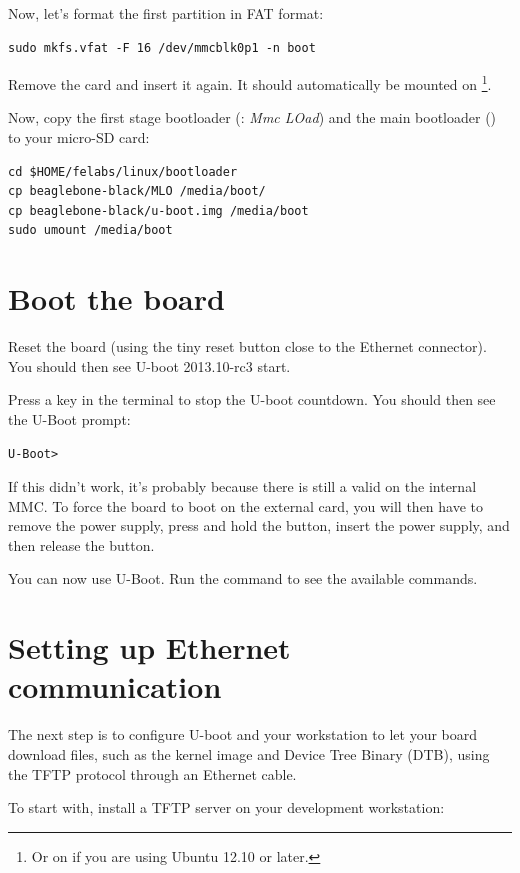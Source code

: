 Now, let's format the first partition in FAT format:

\begin{verbatim}
sudo mkfs.vfat -F 16 /dev/mmcblk0p1 -n boot
\end{verbatim}

Remove the card and insert it again. It should automatically be mounted
on  \footnote{Or on  if you
are using Ubuntu 12.10 or later.}.

Now, copy the first stage bootloader (: {\em Mmc LOad}) and the main
bootloader () to your micro-SD card:

\begin{verbatim}
cd $HOME/felabs/linux/bootloader
cp beaglebone-black/MLO /media/boot/
cp beaglebone-black/u-boot.img /media/boot
sudo umount /media/boot
\end{verbatim}

\section{Boot the board}

Reset the board (using the tiny reset button close to the Ethernet
connector). You should then see U-boot 2013.10-rc3 start.

Press a key in the  terminal to stop the U-boot
countdown. You should then see the U-Boot prompt:
\begin{verbatim}
U-Boot>
\end{verbatim}

If this didn't work, it's probably because there is still a valid
 on the internal MMC. To force the board to boot on the
external card, you will then have to remove the power supply, press and
hold the  button, insert the power supply, and then
release the  button.

You can now use U-Boot. Run the  command to see the available
commands.

\section{Setting up Ethernet communication}

The next step is to configure U-boot and your workstation to let your
board download files, such as the kernel image and Device Tree Binary
(DTB), using the TFTP protocol through an Ethernet cable.

To start with, install a TFTP server on your development workstation:

